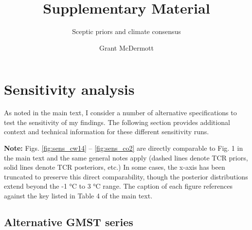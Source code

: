 \documentclass[
]{article}
\title{Supplementary Material}
\subtitle{Sceptic priors and climate consensus}
\author{Grant McDermott}
\date{}
\begin{document}
\maketitle

{
\setcounter{tocdepth}{2}
\tableofcontents
}
\newcommand{\beginsupplement}{%
    \setcounter{table}{0}
    \renewcommand{\thetable}{SM\arabic{table}}%
    \setcounter{figure}{0}
    \renewcommand{\thefigure}{SM\arabic{figure}}%
}
%
    \setcounter{table}{0}
    \renewcommand{\thetable}{SM\arabic{table}}%
    \setcounter{figure}{0}
    \renewcommand{\thefigure}{SM\arabic{figure}}%

\newpage

\hypertarget{sensitivity-analysis}{%
\section{Sensitivity analysis}\label{sensitivity-analysis}}

As noted in the main text, I consider a number of alternative
specifications to test the sensitivity of my findings. The following
section provides additional context and technical information for these
different sensitivity runs.

\textbf{Note:} Figs. \ref{fig:sens_cw14} -- \ref{fig:sens_co2} are
directly comparable to Fig. 1 in the main text and the same general
notes apply (dashed lines denote TCR priors, solid lines denote TCR
posteriors, etc.) In some cases, the x-axis has been truncated to
preserve this direct comparability, though the posterior distributions
extend beyond the -1 °C to 3 °C range. The caption of each figure
references against the key listed in Table 4 of the main text.

\hypertarget{alternative-gmst-series}{%
\subsection{Alternative GMST series}\label{alternative-gmst-series}}
\end{document}
